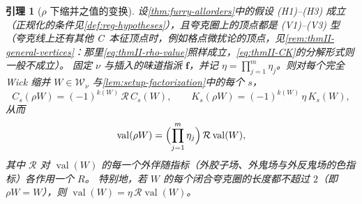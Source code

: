 \documentclass[UTF8,a4paper,11pt,fontset=fandol]{ctexart}
\theoremstyle{cplain}
\newtheorem{lemma}[theorem]{引理}
\theoremstyle{cdefinition}
\theoremstyle{cremark}
\numberwithin{equation}{section}
\newcommand{\Rop}{\mathcal{R}}                       %
\begin{document}
\begin{lemma}[$\rho$ 下缩并之值的变换]\label{lem:thmII-rho-value}
设\cref{thm:furry-allorders}中的假设 (H1)--(H3) 成立（正规化的条件见\cref{def:reg-hypotheses}），且夸克圈上的顶点都是 (V1)--(V3) 型
（夸克线上还有其他 C~本征顶点时，例如格点微扰论的顶点，见\cref{rem:thmII-general-vertices}：那里\cref{eq:thmII-rho-value}照样成立，\cref{eq:thmII-CK}的分解形式则一般不成立）。
固定 $\nu$ 与插入的味道指派 $\boldsymbol f$，并记 $\eta=\prod_{j=1}^m\eta_j$。则对每个完全 Wick 缩并 $W\in\mathcal W_\nu$ 与\cref{lem:setup-factorization}中的每个 $s$，
\begin{equation}\label{eq:thmII-CK}
C_s(\rho W)=(-1)^{k(W)}\,\Rop\,C_s(W),\qquad K_s(\rho W)=(-1)^{k(W)}\,\eta\,K_s(W),
\end{equation}
从而
\begin{equation}\label{eq:thmII-rho-value}
\operatorname{val}(\rho W)=\Bigl(\prod_{j=1}^m\eta_j\Bigr)\,\Rop\operatorname{val}(W),
\end{equation}
其中 $\Rop$ 对 $\operatorname{val}(W)$ 的每一个外伴随指标（外胶子场、外鬼场与外反鬼场的色指标）各作用一个 $R$。
特别地，若 $W$ 的每个闭合夸克圈的长度都不超过 $2$（即 $\rho W=W$），则 $\operatorname{val}(W)=\eta\,\Rop\operatorname{val}(W)$。
\end{lemma}
\end{document}
